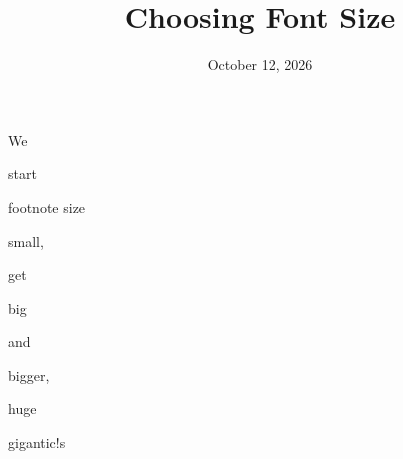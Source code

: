 \documentclass[12pt]{article}
\begin{document}
\title{\textbf{Choosing Font Size}}
\date{October 12, 2026}
\maketitle
\tiny We 

\scriptsize start 

\footnotesize footnote size

\small small,

\normalsize get 

\large big 

\Large and 

\LARGE bigger,

\huge huge 

\Huge gigantic!s
\end{document}
